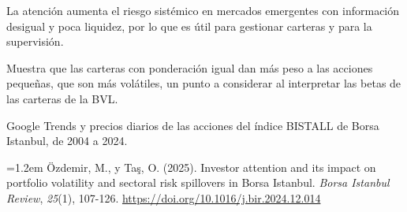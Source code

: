 \documentclass{article}
\newcommand{\cardtitlesize}{\fontsize{34.2}{41.0}\selectfont}
\newcommand{\smallsize}{\fontsize{23.8}{30.9}\selectfont}
\newcommand{\cardtitle}[2][navy]{{\color{#1}\cardtitlesize\bfseries\textls[110]{\MakeUppercase{#2}}}\par\vspace{7mm}}
\begin{document}
\vfill
\hspace*{34mm}\begin{minipage}{773mm}
\begin{tcbraster}[raster columns=3, raster equal height, raster column skip=16mm]
\begin{tcolorbox}[card, raster multicolumn=2]\cardtitle{Conclusiones}La atención aumenta el riesgo sistémico en mercados emergentes con información desigual y poca liquidez, por lo que es útil para gestionar carteras y para la supervisión.\end{tcolorbox}
\begin{tcolorbox}[card=gold, colback=goldSoft]\cardtitle{Aporte al tema 61}Muestra que las carteras con ponderación igual dan más peso a las acciones pequeñas, que son más volátiles, un punto a considerar al interpretar las betas de las carteras de la BVL.\end{tcolorbox}
\end{tcbraster}
\end{minipage}

\vfill
\begin{tcolorbox}[enhanced, sharp corners, colback=navy, boxrule=0pt, width=\paperwidth,
  left=34mm, right=34mm, top=14mm, bottom=11mm,
  overlay={\fill[gold] (frame.north west) rectangle ([yshift=-5mm]frame.north east);}]
\begin{minipage}[c]{245mm}\raggedright
{\color{acento}\smallsize\bfseries{}}\par\vspace{5mm}
{\color{white}\smallsize Google Trends y precios diarios de las acciones del índice BISTALL de Borsa Istanbul, de 2004 a 2024.}
\end{minipage}\hfill
\begin{minipage}[c]{385mm}\raggedright
{\color{acento}\smallsize\bfseries{}}\par\vspace{5mm}
{\color{white}\smallsize\hangindent=1.2em Özdemir, M., y Taş, O. (2025). Investor attention and its impact on portfolio volatility and sectoral risk spillovers in Borsa Istanbul. \textit{Borsa Istanbul Review}, \textit{25}(1), 107-126. \url{https://doi.org/10.1016/j.bir.2024.12.014}\par}
\end{minipage}\hfill
\begin{minipage}[c]{100mm}\centering
{}\par\vspace{4mm}
{\color{acento}\fontsize{17}{21}\selectfont\bfseries{}}
\end{minipage}
\end{tcolorbox}
\end{document}
